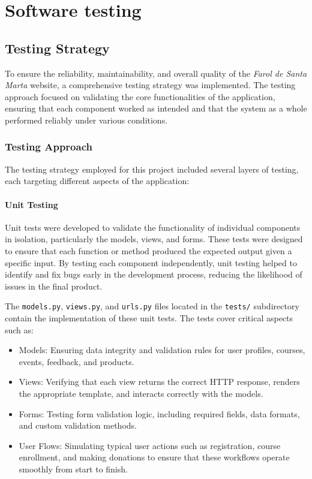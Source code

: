 \chapter{Software testing}
\label{ch:testing}

\section{Testing Strategy}

To ensure the reliability, maintainability, and overall quality of the \textit{Farol de Santa Marta} website, a comprehensive testing strategy was implemented. The testing approach focused on validating the core functionalities of the application, ensuring that each component worked as intended and that the system as a whole performed reliably under various conditions.

\subsection{Testing Approach}

The testing strategy employed for this project included several layers of testing, each targeting different aspects of the application:

\subsubsection{Unit Testing}

Unit tests were developed to validate the functionality of individual components in isolation, particularly the models, views, and forms. These tests were designed to ensure that each function or method produced the expected output given a specific input. By testing each component independently, unit testing helped to identify and fix bugs early in the development process, reducing the likelihood of issues in the final product.

The \texttt{models.py}, \texttt{views.py}, and \texttt{urls.py} files located in the \texttt{tests/} subdirectory contain the implementation of these unit tests. The tests cover critical aspects such as:

\begin{itemize}
    \item Models: Ensuring data integrity and validation rules for user profiles, courses, events, feedback, and products.
    \item Views: Verifying that each view returns the correct HTTP response, renders the appropriate template, and interacts correctly with the models.
    \item Forms: Testing form validation logic, including required fields, data formats, and custom validation methods.
    \item User Flows: Simulating typical user actions such as registration, course enrollment, and making donations to ensure that these workflows operate smoothly from start to finish.
\end{itemize}

